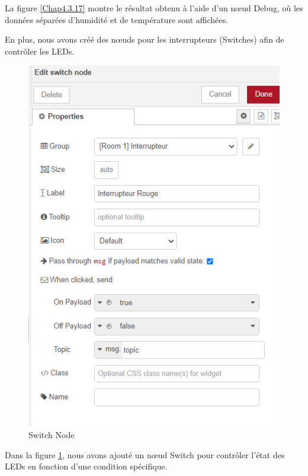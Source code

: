 La figure \ref{Chap4.3.17} montre le résultat obtenu à l'aide d'un nœud Debug, où les données séparées d'humidité et de température sont affichées.

En plus, nous avons créé des nœuds pour les interrupteurs (Switches) afin de contrôler les LEDs.

\begin{figure}[H]
\centering
\includegraphics[width=13cm]{Images/Node-6.png}
\caption{Switch Node}
\label{Chap4.3.18}
\end{figure}

Dans la figure \ref{Chap4.3.18}, nous avons ajouté un nœud Switch pour contrôler l'état des LEDs en fonction d'une condition spécifique.

